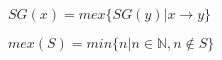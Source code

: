 {\raggedright
    \( SG(x) = mex\{SG(y)|x\rightarrow y\} \) \par
    \( mex(S) = min\{n|n\in\mathbb{N}, n\notin S\} \) \par
}